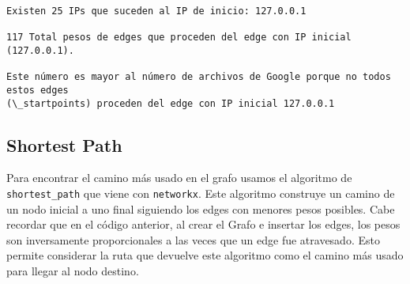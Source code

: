 \documentclass[11pt]{article}
\begin{document}
    \begin{Verbatim}[commandchars=\\\{\}]
Existen 25 IPs que suceden al IP de inicio: 127.0.0.1

117 Total pesos de edges que proceden del edge con IP inicial (127.0.0.1).

Este número es mayor al número de archivos de Google porque no todos estos edges
(\_startpoints) proceden del edge con IP inicial 127.0.0.1
    \end{Verbatim}

    \hypertarget{shortest-path}{%
\subsection{Shortest Path}\label{shortest-path}}

Para encontrar el camino más usado en el grafo usamos el algoritmo de
\texttt{shortest\_path} que viene con \texttt{networkx}. Este algoritmo
construye un camino de un nodo inicial a uno final siguiendo los edges
con menores pesos posibles. Cabe recordar que en el código anterior, al
crear el Grafo e insertar los edges, los pesos son inversamente
proporcionales a las veces que un edge fue atravesado. Esto permite
considerar la ruta que devuelve este algoritmo como el camino más usado
para llegar al nodo destino.
\end{document}
